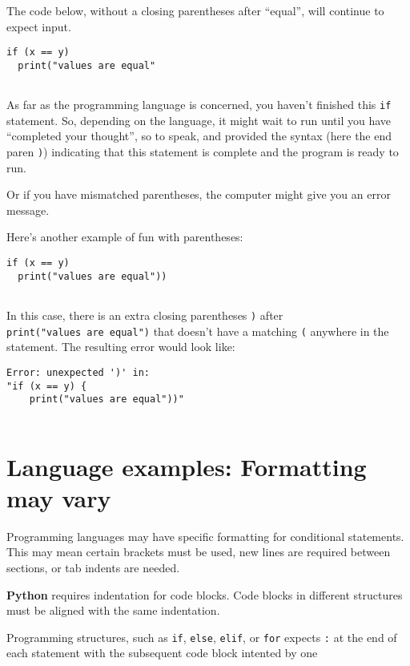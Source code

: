 \documentclass[
]{book}
\begin{document}
The code below, without a closing parentheses after ``equal'', will continue to expect input.

\begin{verbatim}
if (x == y) 
  print("values are equal"
  
\end{verbatim}

As far as the programming language is concerned, you haven't finished this \texttt{if} statement. So, depending on the language, it might wait to run until you have ``completed your thought'', so to speak, and provided the syntax (here the end paren \texttt{)}) indicating that this statement is complete and the program is ready to run.

Or if you have mismatched parentheses, the computer might give you an error message.

Here's another example of fun with parentheses:

\begin{verbatim}
if (x == y) 
  print("values are equal"))
  
\end{verbatim}

In this case, there is an extra closing parentheses \texttt{)} after \texttt{print("values\ are\ equal")} that doesn't have a matching \texttt{(} anywhere in the statement. The resulting error would look like:

\begin{verbatim}
Error: unexpected ')' in:
"if (x == y) {
    print("values are equal"))"
    
\end{verbatim}

\section{Language examples: Formatting may vary}\label{language-examples-formatting-may-vary}

Programming languages may have specific formatting for conditional statements. This may mean certain brackets must be used, new lines are required between sections, or tab indents are needed.

\textbf{Python} requires indentation for code blocks. Code blocks in different structures must be aligned with the same indentation.

Programming structures, such as \texttt{if}, \texttt{else}, \texttt{elif}, or \texttt{for} expects \texttt{:} at the end of each statement with the subsequent code block intented by one
\end{document}
